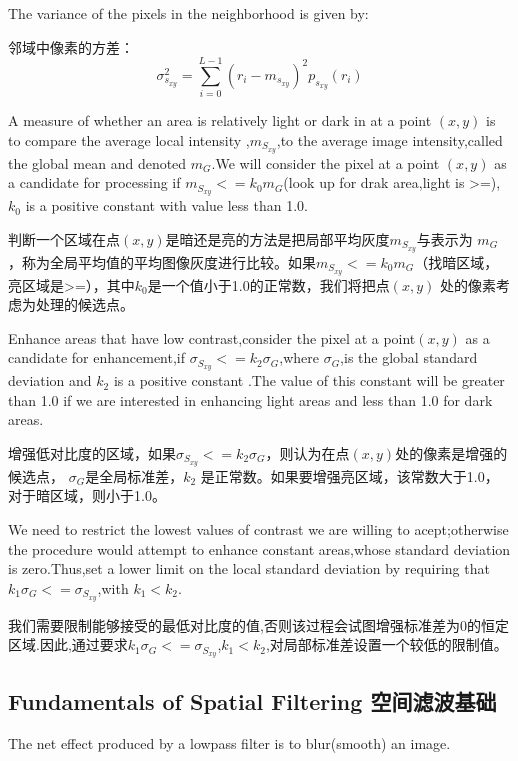 \documentclass[12pt]{article}
\numberwithin{equation}{section}%
\begin{document}
The variance of the pixels in the neighborhood is given by:

邻域中像素的方差：
\begin{equation} \label {3.23}
\sigma^{2}_{s_{xy}}=\sum_{i=0}^{L-1}(r_{i}-m_{s_{xy}})^{2}p_{s_{xy}}(r_{i})
\end{equation}

A measure of whether an area is relatively light or dark in at  a point $(x,y)$ is to compare the average local intensity ,$m_{S_{xy}}$,to the average image intensity,called the global mean and denoted $m_{G}$.We will consider the pixel at a point $(x,y)$ as a candidate for processing if $m_{S_{xy}}<=k_{0}m_{G}$(look up for drak area,light is >=),$k_{0}$ is a positive constant with value less than 1.0.

判断一个区域在点$(x,y)$是暗还是亮的方法是把局部平均灰度$m_{S_{xy}}$与表示为 $m_{G}$，称为全局平均值的平均图像灰度进行比较。如果$m_{S_{xy}}<=k_{0}m_{G}$（找暗区域，亮区域是>=），其中$k_{0}$是一个值小于1.0的正常数，我们将把点$(x,y)$ 处的像素考虑为处理的候选点。

Enhance areas that have low contrast,consider the pixel at a point$(x,y)$ as a candidate for enhancement,if $ \sigma_{S_{xy}}<=k_{2}\sigma_{G}$,where $\sigma_{G}$,is the global standard deviation and $k_{2}$ is a positive constant .The value of this constant will be greater than 1.0 if we are interested in enhancing light areas and less than 1.0 for dark areas.

增强低对比度的区域，如果$ \sigma_{S_{xy}}<=k_{2}\sigma_{G}$，则认为在点$(x,y)$处的像素是增强的候选点， $\sigma_{G}$是全局标准差，$k_{2}$ 是正常数。如果要增强亮区域，该常数大于1.0，对于暗区域，则小于1.0。

We need to restrict the lowest values of contrast we are willing to acept;otherwise the procedure would attempt to enhance constant areas,whose standard deviation is zero.Thus,set a lower limit on the local standard deviation by requiring that $k_{1}\sigma_{G}<=\sigma_{S_{xy}}$,with $k_{1}<k_{2}$.

我们需要限制能够接受的最低对比度的值,否则该过程会试图增强标准差为0的恒定区域.因此,通过要求$k_{1}\sigma_{G}<=\sigma_{S_{xy}}$,$k_{1}<k_{2}$,对局部标准差设置一个较低的限制值。

\subsection{Fundamentals of Spatial Filtering 空间滤波基础}

The net effect produced by a lowpass filter is to blur(smooth)  an image.
\end{document}
